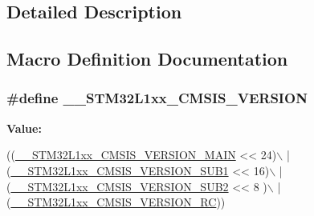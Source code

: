 \subsection{Detailed Description}


\subsection{Macro Definition Documentation}
\hypertarget{group___library__configuration__section_gac0af9c7534b4bd8c8727b18f87b5ff2c}{
\subsubsection[{\-\_\-\-\_\-\-S\-T\-M32\-L1xx\-\_\-\-C\-M\-S\-I\-S\-\_\-\-V\-E\-R\-S\-I\-O\-N}]{\setlength{\rightskip}{0pt plus 5cm}\#define \-\_\-\-\_\-\-S\-T\-M32\-L1xx\-\_\-\-C\-M\-S\-I\-S\-\_\-\-V\-E\-R\-S\-I\-O\-N}}\label{group___library__configuration__section_gac0af9c7534b4bd8c8727b18f87b5ff2c}
{\bfseries Value\-:}
\begin{DoxyCode}
((\hyperlink{group___library__configuration__section_ga7b0deaa970bfbbe1145abd1cba8a5957}{\_\_STM32L1xx\_CMSIS\_VERSION\_MAIN} << 24)\(\backslash\)
                                         |(\hyperlink{group___library__configuration__section_ga6f7924aaddc0243d031cbe8d34db786a}{\_\_STM32L1xx\_CMSIS\_VERSION\_SUB1} << 
      16)\(\backslash\)
                                         |(\hyperlink{group___library__configuration__section_ga1dfac30132feed1a41875d404d77881a}{\_\_STM32L1xx\_CMSIS\_VERSION\_SUB2} << 
      8 )\(\backslash\)
                                         |(\hyperlink{group___library__configuration__section_gaa41501c0f38513be75dc3c0af686438b}{\_\_STM32L1xx\_CMSIS\_VERSION\_RC}))
\end{DoxyCode}
